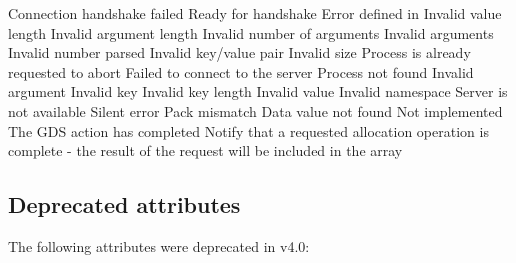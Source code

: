 \begin{constantdesc}
Connection handshake failed
%
Ready for handshake
%
Error defined in 
%
Invalid value length
%
Invalid argument length
%
Invalid number of arguments
%
Invalid arguments
%
Invalid number parsed
%
Invalid key/value pair
%
Invalid size
%
Process is already requested to abort
%
Failed to connect to the server
%
Process not found
%
Invalid argument
%
Invalid key
%
Invalid key length
%
Invalid value
%
Invalid namespace
%
Server is not available
%
Silent error
%
Pack mismatch
%
Data value not found
%
Not implemented
%
The \ac{GDS} action has completed
%
Notify that a requested allocation operation is complete - the result of
the request will be included in the  array
%
\end{constantdesc}

\subsection{Deprecated attributes}

The following attributes were deprecated in v4.0:


